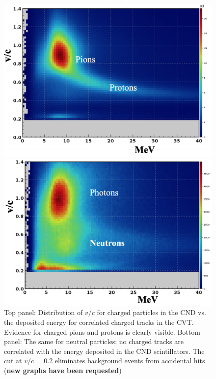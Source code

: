 \documentclass[final,3p,twocolumn]{elsarticle}
\begin{document}
\begin{figure}[t!]
\centerline{\includegraphics[width=0.9\columnwidth]{CND1.png}}
\centerline{\includegraphics[width=0.9\columnwidth]{CND2.png}}
\caption{Top panel: Distribution of $v/c$ for charged particles in the CND vs. the deposited energy for correlated
charged tracks in the CVT. Evidence for charged pions and protons is clearly visible.  Bottom panel: The same for
neutral particles; no charged tracks are correlated with the energy deposited in the CND scintillators. The cut at
$v/c$ = 0.2 eliminates background events from accidental hits. ({\bf new graphs have been requested}) } 
\label{CND-neutrals}
\end{figure} 
\end{document}
